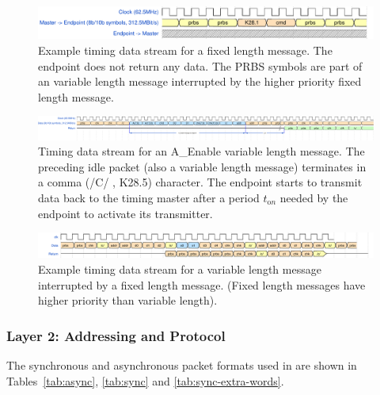 \documentclass{dune}
\begin{document}
\begin{landscape}
\begin{figure}[h]
	\centering
	\includegraphics[width=\linewidth]{dts_sp-fixed-length-message.pdf}
	\caption{Example timing data stream for a fixed length message. The endpoint does not return any data. The PRBS symbols are part of an variable length message interrupted by the higher priority fixed length message.}
	\label{fig:wave-fixed-length}
\end{figure}

\begin{figure}[h]
	\centering
	\includegraphics[width=\linewidth]{dts_sp-variable-length-message-a_enable_ed.pdf}
	\caption{Timing data stream for an A\_Enable variable length message. The preceding idle packet (also a variable length message) terminates in a comma (/C/ , K28.5) character. The endpoint starts to transmit data back to the timing master after a period $t_{\mathrm on}$ needed by the endpoint to activate its transmitter.  
	}
	\label{fig:wave-variable-length}
\end{figure}

\begin{figure}[h]
	\centering
	\includegraphics[width=\linewidth]{timing_protocol_wavedrom_01.pdf}
	\caption{Example timing data stream for a variable length message interrupted by a fixed length message. (Fixed length messages have higher priority than variable length).}
	\label{fig:wave-interupted-message}
\end{figure}
\end{landscape}


\subsubsection{Layer 2: Addressing and Protocol}
\label{section:addressing_protocol}

The synchronous and asynchronous packet formats used in  are shown in Tables~\ref{tab:async}, \ref{tab:sync} and \ref{tab:sync-extra-words}.
\end{document}
